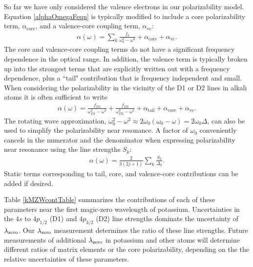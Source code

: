 So far we have only considered the valence electrons in our polarizability model. Equation \ref{alphaOmegaFeqn} is typically modified to include a core polarizability term, $\alpha_\textrm{core}$, and a valence-core coupling term, $\alpha_\textrm{vc}$:
\begin{eqnarray}
\label{alphaOmegaCore}
\alpha(\omega)=\sum_k\frac{f_{k}}{\omega_k^2-\omega^2} + \alpha_\textrm{core} + \alpha_\textrm{vc}.
\end{eqnarray}
The core and valence-core coupling terms do not have a significant frequency dependence in the optical range. In addition, the valence term is typically broken up into the strongest terms that are explicitly written out with a frequency dependence, plus a ``tail" contribution that is frequency independent and small. When considering the polarizability in the vicinity of the D1 or D2 lines in alkali atoms it is often sufficient to write
\begin{eqnarray}
\label{alphaOmegaTail}
\alpha(\omega)=\frac{f_{D1}}{\omega_{D1}^2-\omega^2} + \frac{f_{D2}}{\omega_{D2}^2-\omega^2} + \alpha_\textrm{tail} + \alpha_\textrm{core} + \alpha_\textrm{vc}.
\end{eqnarray}
The rotating wave approximation, $\omega_{0}^2-\omega^2 \approx 2\omega_0(\omega_0-\omega) = 2\omega_0\Delta$, can also be used to simplify the polarizability near resonance. A factor of $\omega_0$ conveniently cancels in the numerator and the denominator when expressing polarizability near resonance using the line strengths $S_k$:
\begin{eqnarray}
\label{alphaOmegaRWA}
\alpha(\omega)=\frac{2}{3(2j+1)}\sum_k   \frac{S_k}{\Delta_k}.
\end{eqnarray}
Static terms corresponding to tail, core, and valence-core contributions can be added if desired.


Table \ref{kMZWcontTable} summarizes the contributions of each of these parameters near the first magic-zero wavelength of potassium. Uncertainties in the $4s$ to $4p_{1/2}$ (D1) and $4p_{3/2}$ (D2) line strengths dominate the uncertainty of $\lambda_\textrm{zero}$. Our $\lambda_\textrm{zero}$ measurement determines the ratio of these line strengths. Future measurements of additional $\lambda_\textrm{zero}$ in potassium and other atoms will determine different ratios of matrix elements or the core polarizability, depending on the the relative uncertainties of these parameters.



